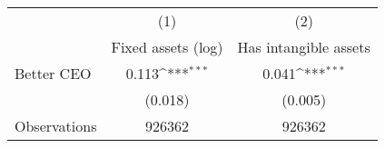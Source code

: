 {
\def\sym#1{\ifmmode^{#1}\else\(^{#1}\)\fi}
\begin{tabular}{l*{2}{c}}
\hline\hline
                    &\multicolumn{1}{c}{(1)}&\multicolumn{1}{c}{(2)}\\
                    &\multicolumn{1}{c}{Fixed assets (log)}&\multicolumn{1}{c}{Has intangible assets}\\
\hline
Better CEO          &       0.113\sym{***}&       0.041\sym{***}\\
                    &     (0.018)         &     (0.005)         \\
\hline
Observations        &      926362         &      926362         \\
\hline\hline
\end{tabular}
}
